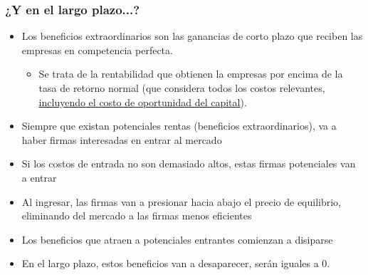 \documentclass{beamer}
\begin{document}
\begin{frame}
\frametitle{¿Y en el largo plazo...?}
\begin{itemize}
\item Los beneficios extraordinarios son las ganancias de corto plazo que reciben las empresas en competencia perfecta.
    \begin{itemize}
    \item Se trata de la rentabilidad que obtienen la empresas por encima de la tasa de retorno normal (que considera todos los costos relevantes, \underline{incluyendo el costo de oportunidad del capital}).
    \end{itemize}
    \item Siempre que existan potenciales rentas (beneficios extraordinarios), va a haber firmas interesadas en entrar al mercado
    \item Si los costos de entrada no son demasiado altos, estas firmas potenciales van a entrar
    \item Al ingresar, las firmas van a presionar hacia abajo el precio de equilibrio, eliminando del mercado a las firmas menos eficientes
    \item Los beneficios que atraen a potenciales entrantes comienzan a disiparse
    \item En el largo plazo, estos beneficios van a desaparecer, serán iguales a 0.
    \end{itemize}
\end{frame}
\end{document}
